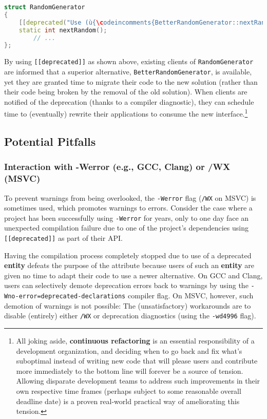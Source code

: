 \begin{lstlisting}[language=C++]
struct RandomGenerator
{
    [[deprecated("Use (ù{\codeincomments{BetterRandomGenerator::nextRandom()}}ù) instead.")]]
    static int nextRandom();
        // ...
};
\end{lstlisting}
    
\noindent By using \texttt{[[deprecated]]} as shown above, existing clients of
\texttt{RandomGenerator} are informed that a superior
alternative, \texttt{BetterRandomGenerator}, is available, yet they are granted time to
migrate their code to the new solution (rather than their code being broken by the
removal of the old solution). When clients are notified of the
deprecation (thanks to a compiler diagnostic), they can schedule time to
(eventually) rewrite their applications to consume the new interface.{\cprotect\footnote{All joking aside, \textbf{continuous refactoring} is
an essential responsibility of a development organization, and
deciding when to go back and fix what's suboptimal instead of writing
new code that will please users and contribute more immediately to the
bottom line will forever be a source of tension. Allowing disparate
development teams to address such improvements in their own respective
time frames (perhaps subject to some reasonable overall deadline
date) is a proven real-world practical way of ameliorating this
  tension.}}

\subsection[Potential Pitfalls]{Potential Pitfalls}\label{potential-pitfalls}

\subsubsection[Interaction with {\tt -Werror} (e.g., GCC, Clang) or {\tt /WX} (MSVC)]{Interaction with {\SubsubsecCode -Werror} (e.g., GCC, Clang) or {\SubsubsecCode /WX} (MSVC)}\label{interaction-with--werror-(e.g,-gcc,-clang)-or-/wx-(msvc)}

To prevent warnings from being overlooked, the \texttt{-Werror} flag
(\texttt{/WX} on MSVC) is sometimes used, which promotes warnings to
errors. Consider the case where a project has been successfully using
\texttt{-Werror} for years, only to one day face an unexpected
compilation failure due to one of the project's dependencies using
\texttt{[[deprecated]]} as part of their API.

Having the compilation process completely stopped due to use of a
deprecated \textbf{entity} defeats the purpose of the attribute because users of such an \textbf{entity} are given no time to adapt their code
to use a newer alternative. On GCC and Clang, users can selectively demote deprecation errors back to warnings by using the
\texttt{-Wno-error=deprecated-declarations} compiler flag. On MSVC,
however, such demotion of warnings is not possible: The (unsatisfactory)
workarounds are to disable (entirely) either \texttt{/WX} or deprecation
diagnostics (using the \texttt{-wd4996} flag).

